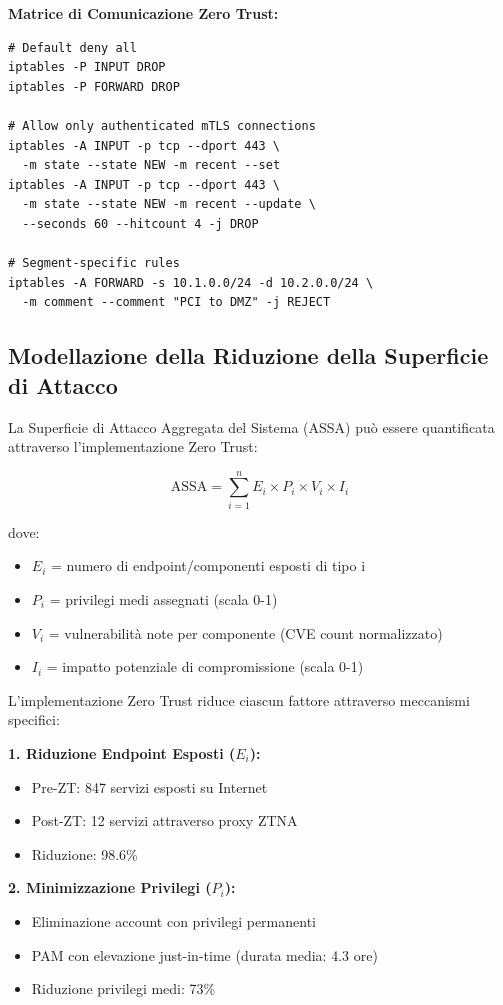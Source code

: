 \textbf{Matrice di Comunicazione Zero Trust:}
\begin{lstlisting}[caption={Regole iptables per micro-segmentazione},label={lst:iptables}]
# Default deny all
iptables -P INPUT DROP
iptables -P FORWARD DROP

# Allow only authenticated mTLS connections
iptables -A INPUT -p tcp --dport 443 \
  -m state --state NEW -m recent --set
iptables -A INPUT -p tcp --dport 443 \
  -m state --state NEW -m recent --update \
  --seconds 60 --hitcount 4 -j DROP

# Segment-specific rules
iptables -A FORWARD -s 10.1.0.0/24 -d 10.2.0.0/24 \
  -m comment --comment "PCI to DMZ" -j REJECT
\end{lstlisting}

\subsection{Modellazione della Riduzione della Superficie di Attacco}

La Superficie di Attacco Aggregata del Sistema (ASSA) può essere quantificata attraverso l'implementazione Zero Trust:

\begin{equation}
\text{ASSA} = \sum_{i=1}^{n} E_i \times P_i \times V_i \times I_i
\end{equation}

dove:
\begin{itemize}
    \item $E_i$ = numero di endpoint/componenti esposti di tipo i
    \item $P_i$ = privilegi medi assegnati (scala 0-1)
    \item $V_i$ = vulnerabilità note per componente (CVE count normalizzato)
    \item $I_i$ = impatto potenziale di compromissione (scala 0-1)
\end{itemize}

L'implementazione Zero Trust riduce ciascun fattore attraverso meccanismi specifici:

\textbf{1. Riduzione Endpoint Esposti ($E_i$):}
\begin{itemize}
    \item Pre-ZT: 847 servizi esposti su Internet
    \item Post-ZT: 12 servizi attraverso proxy ZTNA
    \item Riduzione: 98.6\%
\end{itemize}

\textbf{2. Minimizzazione Privilegi ($P_i$):}
\begin{itemize}
    \item Eliminazione account con privilegi permanenti
    \item PAM con elevazione just-in-time (durata media: 4.3 ore)
    \item Riduzione privilegi medi: 73\%
\end{itemize}

